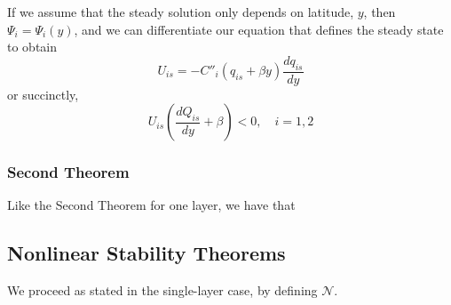 \documentclass[12pt]{article}
\begin{document}
{{{            If we assume that the steady solution only depends on latitude, $y$, then $\Psi_i = \Psi_i(y)$, and we can differentiate our equation that defines the steady state to obtain
            $$
            U_{is} = -C''_i(q_{is} + \beta y) \frac{dq_{is}}{dy}
            $$
            or succinctly,
            $$
            U_{is} \left(\frac{d Q_{is}}{dy} + \beta \right) < 0, \quad i=1,2
            $$
        }
        \subsubsection{Second Theorem}{
            Like the Second Theorem for one layer, we have that
        }
    }

    \subsection{Nonlinear Stability Theorems}{
        We proceed as stated in the single-layer case, by defining $\mathcal{N}$.

}}
\end{document}
